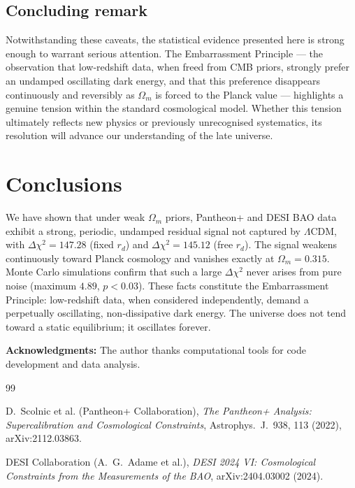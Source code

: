 \documentclass[10pt,a4paper,twocolumn]{article}
\begin{document}
\subsection{Concluding remark}
Notwithstanding these caveats, the statistical evidence presented here is strong enough to warrant serious attention. The Embarrassment Principle — the observation that low‑redshift data, when freed from CMB priors, strongly prefer an undamped oscillating dark energy, and that this preference disappears continuously and reversibly as $\Omega_m$ is forced to the Planck value — highlights a genuine tension within the standard cosmological model. Whether this tension ultimately reflects new physics or previously unrecognised systematics, its resolution will advance our understanding of the late universe.

\section{Conclusions}
We have shown that under weak $\Omega_m$ priors, Pantheon+ and DESI BAO data exhibit a strong, periodic, undamped residual signal not captured by $\Lambda$CDM, with $\Delta\chi^2=147.28$ (fixed $r_d$) and $\Delta\chi^2=145.12$ (free $r_d$). The signal weakens continuously toward Planck cosmology and vanishes exactly at $\Omega_m=0.315$. Monte Carlo simulations confirm that such a large $\Delta\chi^2$ never arises from pure noise (maximum $4.89$, $p<0.03$). These facts constitute the Embarrassment Principle: low-redshift data, when considered independently, demand a perpetually oscillating, non‑dissipative dark energy. The universe does not tend toward a static equilibrium; it oscillates forever.

\vspace{1em}
\textbf{Acknowledgments:} The author thanks computational tools for code development and data analysis.


\begin{thebibliography}{99}

D.~Scolnic et al. (Pantheon+ Collaboration),
\emph{The Pantheon+ Analysis: Supercalibration and Cosmological Constraints},
Astrophys.~J.~938, 113 (2022), arXiv:2112.03863.

DESI Collaboration (A.~G.~Adame et al.),
\emph{DESI 2024 VI: Cosmological Constraints from the Measurements of the BAO},
arXiv:2404.03002 (2024).

\end{thebibliography}
\end{document}
